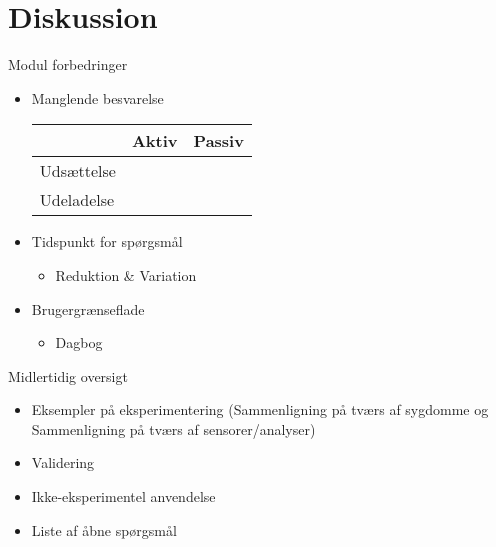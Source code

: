 \section{Diskussion}

\begin{frame}{Modul forbedringer}

\begin{itemize}
\item Manglende besvarelse\\
\begin{tabular}{|l|l|l|}\cline{2-3}
\multicolumn{1}{l|}{} & Aktiv & Passiv\\\hline
Udsættelse & & \\\hline
Udeladelse & & \\\hline
\end{tabular}
\end{itemize}
\begin{itemize}
\item Tidspunkt for spørgsmål
\begin{itemize}
\item Reduktion \& Variation
\end{itemize}
\item Brugergrænseflade
\begin{itemize}
\item Dagbog
\end{itemize}
\end{itemize}

\end{frame}

\begin{frame}{Midlertidig oversigt}
\begin{itemize}
\item Eksempler på eksperimentering (Sammenligning på tværs af sygdomme og Sammenligning på tværs af sensorer/analyser)
\item Validering
\item Ikke-eksperimentel anvendelse
\item Liste af åbne spørgsmål
\end{itemize}
\end{frame}
